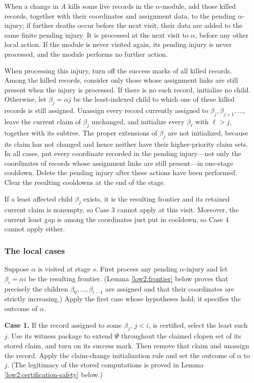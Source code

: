 \documentclass[11pt]{amsart}
\begin{document}
When a change in $A$ kills some live records in the $\alpha$-module, add
those killed records, together with their coordinates and assignment data, to
the pending $\alpha$-injury; if further deaths occur before the next visit,
their data are added to the same finite pending injury. It is processed at the
next visit to $\alpha$, before any other local action. If the module is never
visited again, its pending injury is never processed, and the module performs
no further action.

When processing this injury, turn off the success marks of all killed records.
Among the killed records, consider only those whose assignment links are
still present when the injury is processed. If there is no such record,
initialize no child. Otherwise, let $\beta_j=\alpha j$ be the least-indexed
child to which one of these killed records is still assigned. Unassign every
record currently assigned to $\beta_j,\beta_{j+1},\ldots$, leave the current
claim of $\beta_j$ unchanged, and initialize every $\beta_\ell$ with
$\ell>j$, together with its subtree. The proper extensions of $\beta_j$ are
not initialized, because its claim has not changed and hence neither have
their higher-priority claim sets. In all cases, put every coordinate recorded
in the pending injury---not only the coordinates of records whose assignment
links are still present---in one-stage cooldown. Delete the pending injury
after these actions have been performed. Clear the resulting cooldowns at the
end of the stage.

If a least affected child $\beta_j$ exists, it is the resulting frontier and
its retained current claim is nonempty, so Case 3 cannot apply at this visit.
Moreover, the current least gap is among the coordinates just put in cooldown,
so Case 4 cannot apply either.

\subsubsection{The local cases}

Suppose $\alpha$ is visited at stage $s$. First process any pending
$\alpha$-injury and let $\beta_i=\alpha i$ be the resulting frontier. (Lemma
\ref{low2:frontier} below proves that precisely the children
$\beta_0,\ldots,\beta_{i-1}$ are assigned and that their coordinates are
strictly increasing.) Apply the first case whose hypotheses hold; it specifies
the outcome of $\alpha$.

\medskip
\noindent\textbf{Case 1.}
If the record assigned to some $\beta_j$, $j<i$, is certified, select the
least such $j$. Use its witness package to extend $\Psi$ throughout the
claimed clopen set of its stored claim, and turn on its success mark. Then
remove that claim and unassign the record. Apply the claim-change
initialization rule and set the outcome of $\alpha$ to $j$. (The legitimacy of
the stored computations is proved in Lemma
\ref{low2:certification-safety} below.)
\end{document}
